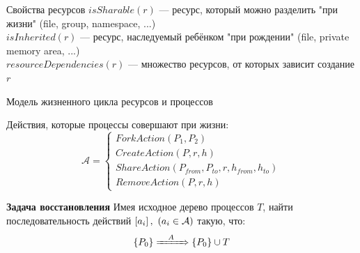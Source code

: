 \begin{frame}{Свойства ресурсов}
\alert{$isSharable(r)$} --- ресурс, который можно разделить "при жизни" (file, group, namespace, ...)\\

\alert{$isInherited(r)$} --- ресурс, наследуемый ребёнком "при рождении" (file, private memory area, ...)\\

\alert{$resourceDependencies(r)$} --- множество ресурсов, от которых зависит создание $r$\\

\end{frame}

\begin{frame}{Модель жизненного цикла ресурсов и процессов}

Действия, которые процессы совершают при жизни:
\begin{equation*}
\mathcal{A} = 
\begin{cases}
ForkAction(P_1, P_2)\\
CreateAction(P, r, h)\\
ShareAction(P_{from}, P_{to}, r, h_{from}, h_{to})\\
RemoveAction(P, r, h)
\end{cases}
\end{equation*}


\begin{block}{\textbf{Задача восстановления}}
Имея исходное дерево процессов $T$, найти последовательность действий $\left[ a_i \right],\ (a_i \in \mathcal{A})$ такую, что:
\begin{equation*}
\left\lbrace P_0 \right\rbrace \xRightarrow{\hspace{1em}A\hspace{1em}} \left\lbrace P_0 \right\rbrace \cup T
\end{equation*}
\end{block}
\end{frame}

